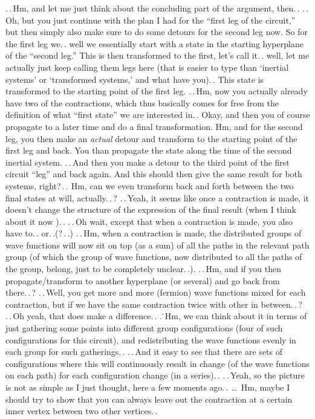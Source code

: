 \documentclass{report}
\begin{document}
.\,.\,Hm, and let me just think about the concluding part of the argument, then.\,. .\,.\,Oh, but you just continue with the plan I had for the ``first leg of the circuit,'' but then simply also make sure to do some detours for the second leg now. So for the first leg we.\,. well we essentially start with a state in the starting hyperplane of the ``second leg.'' This is then transformed to the first, let's call it.\,. well, let me actually just keep calling them legs here (that is easier to type than `inertial systems' or `transformed systems,' and what have you).\,. This state is transformed to the starting point of the first leg. .\,.\,Hm, now you actually already have two of the contractions, which thus basically comes for free from the definition of what ``first state'' we are interested in.\,. Okay, and then you of course propagate to a later time and do a final transformation. Hm, and for the second leg, you then make an \emph{actual} detour and transform to the starting point of the first leg and back. You than propagate the state along the time of the second %
inertial system. .\,.\,And then you make a detour to the third point of the first circuit ``leg'' and back again. And this should then give the same result for both systems, right?\,.\,. Hm, can we even transform back and forth between the two final states at will, actually.\,.\,? %
.\,.\,Yeah, it seems like once a contraction is made, it doesn't change the structure of the expression of the final result (when I think about it now%
).\,. .\,.\,Oh wait, except that when a contraction is made, you also have to.\,. or.\,.(?\,.\,.) .\,.\,Hm, when a contraction is made, the distributed groups of wave functions will now sit on top (as a sum) of all the paths in the relevant path group (of which the group of wave functions, now distributed to all the paths of the group, belong, just to be completely unclear.\,.). .\,.\,Hm, and if you then propagate/transform to another hyperplane (or several) and go back from there.\,.\,? %
.\,.\,Well, you get more and more (fermion) wave functions mixed for each contraction, but if we have the same contraction twice with other in between.\,.\,? .\,.\,Oh yeah, that does make a difference.\,. .\,\.\,Hm, we can think about it in terms of just gathering some points into different group configurations (four of such configurations for this circuit), and redistributing the wave functions evenly in each group for such gatherings.\,. .\,.\,And it easy to see that there are sets of configurations where this will continuously result in change (of the wave functions on each path) for each configuration change (in a series).\,. .\,.\,Yeah, so the picture is not as simple as I just thought, here a few moments ago.\,. %
\ldots\ Hm, maybe I should try to show that you can always leave out the contraction at a certain inner vertex between two other vertices.\,. 
\end{document}
